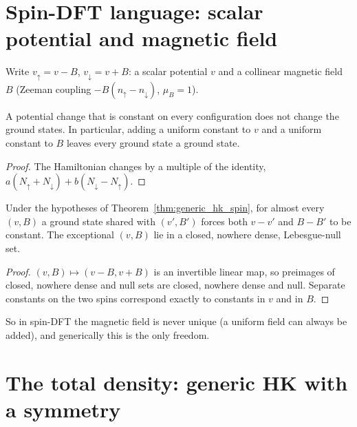 \section{Spin-DFT language: scalar potential and magnetic field}

Write $v_\uparrow=v-B$, $v_\downarrow=v+B$: a scalar potential $v$ and a collinear magnetic field $B$
(Zeeman coupling $-B(n_\uparrow-n_\downarrow)$, $\mu_B=1$).

\begin{theorem}
  \label{thm:groundState_field_shift}
  \leanok
  A potential change that is constant on every configuration does not change the ground states. In
  particular, adding a uniform constant to $v$ and a uniform constant to $B$ leaves every ground state a
  ground state.
\end{theorem}
\begin{proof}
  \leanok
  The Hamiltonian changes by a multiple of the identity, $a(N_\uparrow+N_\downarrow)+b(N_\downarrow-N_\uparrow)$.
\end{proof}

\begin{theorem}
  \label{thm:generic_hk_spin_field}
  \leanok
  Under the hypotheses of Theorem~\ref{thm:generic_hk_spin}, for almost every $(v,B)$ a ground state
  shared with $(v',B')$ forces both $v-v'$ and $B-B'$ to be constant. The exceptional $(v,B)$ lie in a
  closed, nowhere dense, Lebesgue-null set.
\end{theorem}
\begin{proof}
  \leanok
  $(v,B)\mapsto(v-B,v+B)$ is an invertible linear map, so preimages of closed, nowhere dense and null sets
  are closed, nowhere dense and null. Separate constants on the two spins correspond exactly to constants
  in $v$ and in $B$.
\end{proof}

So in spin-DFT the magnetic field is never unique (a uniform field can always be added), and generically
this is the only freedom.

\section{The total density: generic HK with a symmetry}

